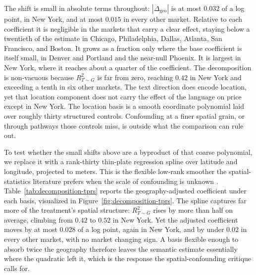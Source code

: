 The shift is small in absolute terms throughout: $|\Delta_{\text{geo}}|$ is at most $0.032$ of a log point, in New York, and at most $0.015$ in every other market. Relative to each coefficient it is negligible in the markets that carry a clear effect, staying below a twentieth of the estimate in Chicago, Philadelphia, Dallas, Atlanta, San Francisco, and Boston. It grows as a fraction only where the base coefficient is itself small, in Denver and Portland and the near-null Phoenix. It is largest in New York, where it reaches about a quarter of the coefficient. The decomposition is non-vacuous because $R^2_{T\sim G}$ is far from zero, reaching $0.42$ in New York and exceeding a tenth in six other markets. The text direction does encode location, yet that location component does not carry the effect of the language on price except in New York. The location basis is a smooth coordinate polynomial laid over roughly thirty structured controls. Confounding at a finer spatial grain, or through pathways those controls miss, is outside what the comparison can rule out.

To test whether the small shifts above are a byproduct of that coarse polynomial, we replace it with a rank-thirty thin-plate regression spline over latitude and longitude, projected to meters. This is the flexible low-rank smoother the spatial-statistics literature prefers when the scale of confounding is unknown \citep{keller2020selecting,gilbert2021causal}. Table~\ref{tab:decomposition-tprs} reports the geography-adjusted coefficient under each basis, visualized in Figure~\ref{fig:decomposition-tprs}. The spline captures far more of the treatment's spatial structure: $R^2_{T\sim G}$ rises by more than half on average, climbing from $0.42$ to $0.52$ in New York. Yet the adjusted coefficient moves by at most $0.028$ of a log point, again in New York, and by under $0.02$ in every other market, with no market changing sign. A basis flexible enough to absorb twice the geography therefore leaves the semantic estimate essentially where the quadratic left it, which is the response the spatial-confounding critique calls for.

